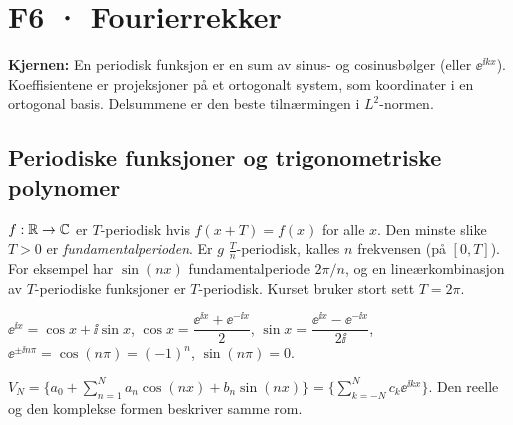 \section{F6 · Fourierrekker}

\textbf{Kjernen:} En periodisk funksjon er en sum av sinus- og cosinusbølger (eller $\ee^{\ii kx}$). Koeffisientene er projeksjoner på et ortogonalt system, som koordinater i en ortogonal basis. Delsummene er den beste tilnærmingen i $L^2$-normen.

\subsection{Periodiske funksjoner og trigonometriske polynomer}
\begin{defn}[periode]
$f:\mathbb{R}\to\mathbb{C}$ er $T$-periodisk hvis $f(x+T)=f(x)$ for alle $x$. Den minste slike $T>0$ er \emph{fundamentalperioden}. Er $g$ $\tfrac Tn$-periodisk, kalles $n$ frekvensen (på $[0,T]$). For eksempel har $\sin(nx)$ fundamentalperiode $2\pi/n$, og en lineærkombinasjon av $T$-periodiske funksjoner er $T$-periodisk. Kurset bruker stort sett $T=2\pi$.
\end{defn}
\begin{teorem}[Euler]
$\ee^{\ii x}=\cos x+\ii\sin x$, \quad $\cos x=\dfrac{\ee^{\ii x}+\ee^{-\ii x}}{2}$, \quad $\sin x=\dfrac{\ee^{\ii x}-\ee^{-\ii x}}{2\ii}$, \quad $\ee^{\pm\ii n\pi}=\cos(n\pi)=(-1)^n$, \quad $\sin(n\pi)=0$.
\end{teorem}
\begin{defn}
$V_N=\bigl\{a_0+\sum_{n=1}^N a_n\cos(nx)+b_n\sin(nx)\bigr\}=\bigl\{\sum_{k=-N}^{N}c_k\ee^{\ii kx}\bigr\}$. Den reelle og den komplekse formen beskriver samme rom.
\end{defn}

